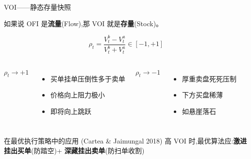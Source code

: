 \documentclass[10pt,aspectratio=169]{beamer}
\begin{document}
\begin{frame}{VOI——静态存量快照}

  如果说 OFI 是\textbf{流量}(Flow),那 VOI 就是\textbf{存量}(Stock)。

  \[
    \rho_t = \frac{V_t^b - V_t^a}{V_t^b + V_t^a} \in [-1, +1]
  \]

  \vfill

  \begin{columns}[t]
    \textcolor{quantgreen}{$\rho_t \to +1$}
    \begin{itemize}
      \item 买单挂单压倒性多于卖单
      \item 价格向上阻力极小
      \item 即将向上跳跃
    \end{itemize}

    \textcolor{quantred}{$\rho_t \to -1$}
    \begin{itemize}
      \item 厚重卖盘死死压制
      \item 下方买盘稀薄
      \item 如悬崖落石
    \end{itemize}
  \end{columns}

  \vfill

  \begin{exampleblock}{在最优执行策略中的应用 (Cartea \& Jaimungal 2018)}
    高 VOI 时,最优算法应:\textbf{激进挂出买单}(防踏空)+ \textbf{深藏挂出卖单}(防扫单收割)
  \end{exampleblock}

\end{frame}
\end{document}
